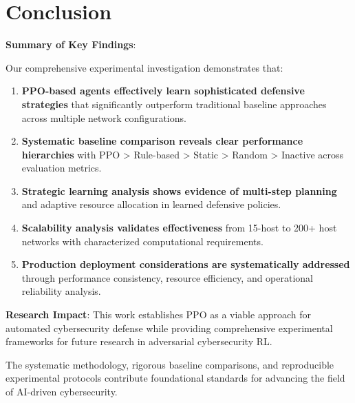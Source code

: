 \documentclass[11pt]{article}
\begin{document}
\section{Conclusion}

\begin{results}
\textbf{Summary of Key Findings}:

Our comprehensive experimental investigation demonstrates that:

\begin{enumerate}
\item \textbf{PPO-based agents effectively learn sophisticated defensive strategies} that significantly outperform traditional baseline approaches across multiple network configurations.

\item \textbf{Systematic baseline comparison reveals clear performance hierarchies} with PPO > Rule-based > Static > Random > Inactive across evaluation metrics.

\item \textbf{Strategic learning analysis shows evidence of multi-step planning} and adaptive resource allocation in learned defensive policies.

\item \textbf{Scalability analysis validates effectiveness} from 15-host to 200+ host networks with characterized computational requirements.

\item \textbf{Production deployment considerations are systematically addressed} through performance consistency, resource efficiency, and operational reliability analysis.
\end{enumerate}
\end{results}

\begin{foundation}
\textbf{Research Impact}: This work establishes PPO as a viable approach for automated cybersecurity defense while providing comprehensive experimental frameworks for future research in adversarial cybersecurity RL.

The systematic methodology, rigorous baseline comparisons, and reproducible experimental protocols contribute foundational standards for advancing the field of AI-driven cybersecurity.
\end{foundation}
\end{document}
